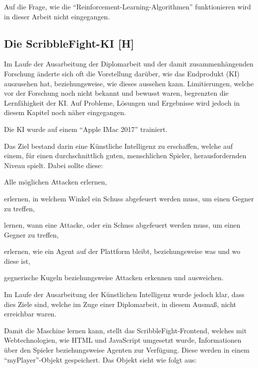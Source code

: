 Auf die Frage, wie die ``Reinforcement-Learning-Algorithmen'' funktionieren wird in dieser Arbeit nicht eingegangen.


\subsection{Die ScribbleFight-KI [H]}\label{maai:scribblefightki}

Im Laufe der Ausarbeitung der Diplomarbeit und der damit zusammenhängenden Forschung änderte sich oft die
Vorstellung darüber, wie das Endprodukt (KI) auszusehen hat, beziehungsweise, wie dieses aussehen kann.
Limitierungen, welche vor der Forschung noch nicht bekannt und bewusst waren, begrenzten die Lernfähigkeit der KI.
Auf Probleme, Lösungen und Ergebnisse wird jedoch in diesem Kapitel noch näher eingegangen.

Die KI wurde auf einem ``Apple IMac 2017'' trainiert.

Das Ziel bestand darin eine Künstliche Intelligenz zu erschaffen, welche auf einem, für einen durchschnittlich guten, menschlichen Spieler, herausfordernden Niveau spielt. Dabei sollte diese:
\begin{compactitem}
    \item Alle möglichen Attacken erlernen,
    \item erlernen, in welchem Winkel ein Schuss abgefeuert werden muss, um einen Gegner zu treffen,
    \item lernen, wann eine Attacke, oder ein Schuss abgefeuert werden muss, um einen Gegner zu treffen,
    \item erlernen, wie ein Agent auf der Plattform bleibt, beziehungsweise was und wo diese ist,
    \item gegnerische Kugeln beziehungsweise Attacken erkennen und ausweichen.
\end{compactitem}
Im Laufe der Ausarbeitung der Künstlichen Intelligenz wurde jedoch klar, dass dies Ziele sind, welche im Zuge einer Diplomarbeit, in diesem Ausmaß, nicht erreichbar waren. %

Damit die Maschine lernen kann, stellt das ScribbleFight-Frontend, welches mit Webtechnologien, wie HTML und JavaScript umgesetzt wurde, Informationen über den Spieler beziehungsweise Agenten zur Verfügung. Diese werden in einem ``myPlayer''-Objekt gespeichert. Das Objekt sieht wie folgt aus:

